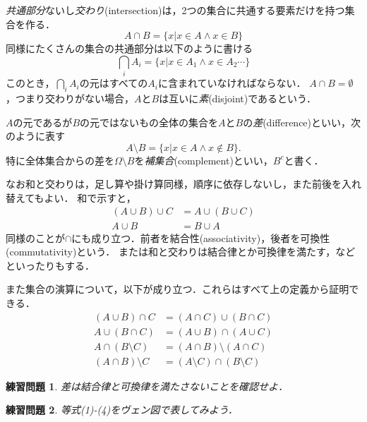 \documentclass[11pt,a4paper]{jsarticle}
\newtheorem{exercise}{練習問題}[section]
\begin{document}
\emph{共通部分}ないし\emph{交わり}(intersection)は，2つの集合に共通する要素だけを持つ集合を作る．
\[
 A \cap B = \{ x | x \in A \wedge x \in B\}
\]
同様にたくさんの集合の共通部分は以下のように書ける
\[
 \bigcap_i A_i = \{ x | x \in A_1 \wedge x \in A_2 \cdots \}
\]
このとき，$\bigcap_i A_i$の元はすべての$A_i$に含まれていなければならない．
$A \cap B = \emptyset$，つまり交わりがない場合，$A$と$B$は互いに\emph{素}(disjoint)であるという．

$A$の元であるが$B$の元ではないもの全体の集合を$A$と$B$の\emph{差}(difference)といい，次のように表す
\[
 A \setminus B = \{ x | x \in A \wedge x \not\in B\}.
\]
特に全体集合からの差を$\Omega \setminus B$を\emph{補集合}(complement)といい，$B^c$と書く．

なお和と交わりは，足し算や掛け算同様，順序に依存しないし，また前後を入れ替えてもよい．
和で示すと，
\begin{align*}
 (A \cup B) \cup C & = A \cup (B \cup C) \\
 A \cup B & = B \cup A
\end{align*}
同様のことが$\cap$にも成り立つ．前者を結合性(associativity)，後者を可換性(commutativity)という．
または和と交わりは結合律とか可換律を満たす，などといったりもする．

また集合の演算について，以下が成り立つ．これらはすべて上の定義から証明できる．
\begin{align}
(A \cup B) \cap C &= (A \cap C) \cup (B \cap C) \\
A \cup (B \cap C) &= (A \cup B) \cap (A \cup C) \\
A \cap (B \setminus C) &= (A \cap B) \setminus (A \cap C) \\
(A \cap B) \setminus C &= (A \setminus C) \cap (B \setminus C) 
\end{align}


\begin{exercise}
差は結合律と可換律を満たさないことを確認せよ．
\end{exercise}


\begin{exercise}
等式(1)-(4)をヴェン図で表してみよう．
\end{exercise}


%



%
\end{document}

